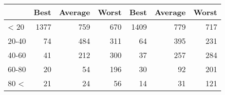 
\begin{tabular}[t]{lrrrrrr}
\toprule
 & Best & Average & Worst & Best & Average & Worst\\
\midrule
< 20 & 1377 & 759 & 670 & 1409 & 779 & 717\\
20-40 & 74 & 484 & 311 & 64 & 395 & 231\\
40-60 & 41 & 212 & 300 & 37 & 257 & 284\\
60-80 & 20 & 54 & 196 & 30 & 92 & 201\\
80 < & 21 & 24 & 56 & 14 & 31 & 121\\
\bottomrule
\end{tabular}
